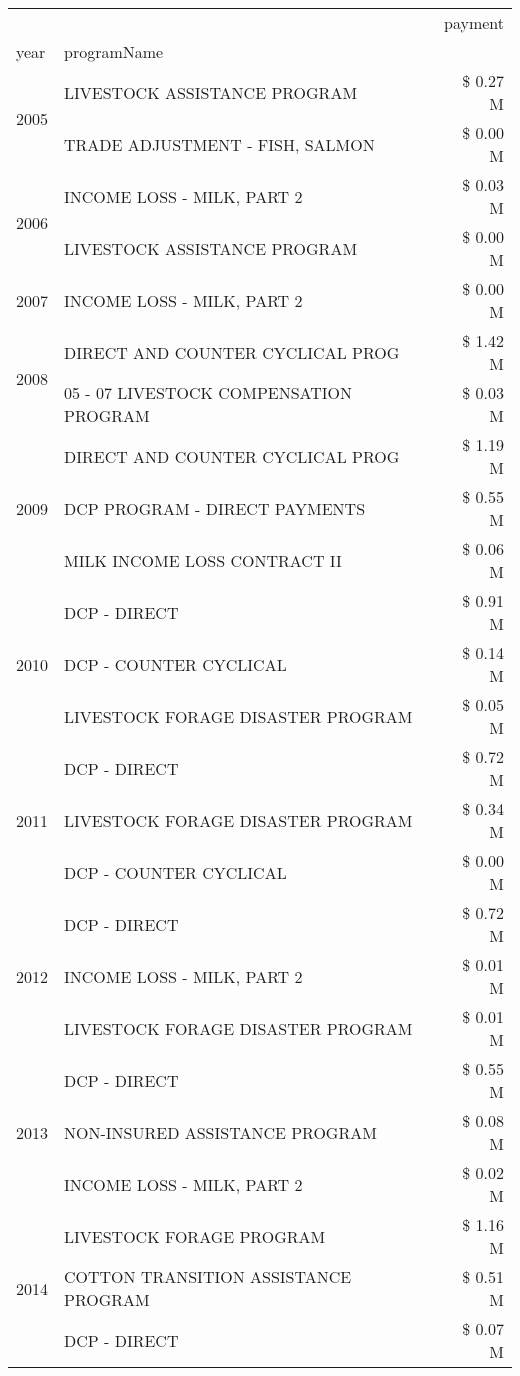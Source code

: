 \begin{tabular}{llr}
\toprule
 &  & payment \\
year & programName &  \\
\midrule
\multirow[t]{2}{*}{2005} & LIVESTOCK ASSISTANCE PROGRAM & \$ 0.27 M \\
 & TRADE ADJUSTMENT - FISH, SALMON & \$ 0.00 M \\
\cline{1-3}
\multirow[t]{2}{*}{2006} & INCOME LOSS - MILK, PART 2 & \$ 0.03 M \\
 & LIVESTOCK ASSISTANCE PROGRAM & \$ 0.00 M \\
\cline{1-3}
2007 & INCOME LOSS - MILK, PART 2 & \$ 0.00 M \\
\cline{1-3}
\multirow[t]{2}{*}{2008} & DIRECT AND COUNTER CYCLICAL PROG & \$ 1.42 M \\
 & 05 - 07 LIVESTOCK COMPENSATION PROGRAM & \$ 0.03 M \\
\cline{1-3}
\multirow[t]{3}{*}{2009} & DIRECT AND COUNTER CYCLICAL PROG & \$ 1.19 M \\
 & DCP PROGRAM - DIRECT PAYMENTS & \$ 0.55 M \\
 & MILK INCOME LOSS CONTRACT II & \$ 0.06 M \\
\cline{1-3}
\multirow[t]{3}{*}{2010} & DCP - DIRECT & \$ 0.91 M \\
 & DCP - COUNTER CYCLICAL & \$ 0.14 M \\
 & LIVESTOCK FORAGE DISASTER PROGRAM & \$ 0.05 M \\
\cline{1-3}
\multirow[t]{3}{*}{2011} & DCP - DIRECT & \$ 0.72 M \\
 & LIVESTOCK FORAGE DISASTER PROGRAM & \$ 0.34 M \\
 & DCP - COUNTER CYCLICAL & \$ 0.00 M \\
\cline{1-3}
\multirow[t]{3}{*}{2012} & DCP - DIRECT & \$ 0.72 M \\
 & INCOME LOSS - MILK, PART 2 & \$ 0.01 M \\
 & LIVESTOCK FORAGE DISASTER PROGRAM & \$ 0.01 M \\
\cline{1-3}
\multirow[t]{3}{*}{2013} & DCP - DIRECT & \$ 0.55 M \\
 & NON-INSURED ASSISTANCE PROGRAM & \$ 0.08 M \\
 & INCOME LOSS - MILK, PART 2 & \$ 0.02 M \\
\cline{1-3}
\multirow[t]{3}{*}{2014} & LIVESTOCK FORAGE PROGRAM & \$ 1.16 M \\
 & COTTON TRANSITION ASSISTANCE PROGRAM & \$ 0.51 M \\
 & DCP - DIRECT & \$ 0.07 M \\

\end{tabular}
